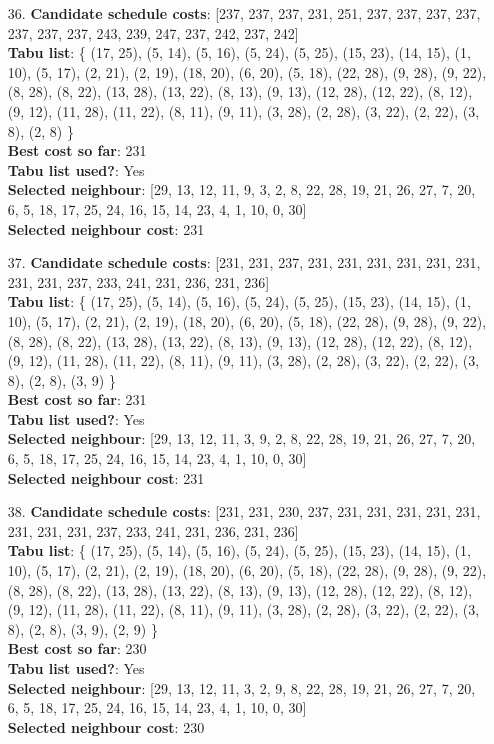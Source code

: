 \documentclass[fleqn]{article}
\begin{document}
\begin{itemize}
    \item[36.] \textbf{Candidate schedule costs}: [237, 237, 237, 231, 251, 237, 237, 237, 237, 237, 237, 237, 243, 239, 247, 237, 242, 237, 242] \\
    \textbf{Tabu list}: \{ (17, 25), (5, 14), (5, 16), (5, 24), (5, 25), (15, 23), (14, 15), (1, 10), (5, 17), (2, 21), (2, 19), (18, 20), (6, 20), (5, 18), (22, 28), (9, 28), (9, 22), (8, 28), (8, 22), (13, 28), (13, 22), (8, 13), (9, 13), (12, 28), (12, 22), (8, 12), (9, 12), (11, 28), (11, 22), (8, 11), (9, 11), (3, 28), (2, 28), (3, 22), (2, 22), (3, 8), (2, 8) \} \\
    \textbf{Best cost so far}: 231 \\
    \textbf{Tabu list used?}: Yes \\
    \textbf{Selected neighbour}: [29, 13, 12, 11, 9, 3, 2, 8, 22, 28, 19, 21, 26, 27, 7, 20, 6, 5, 18, 17, 25, 24, 16, 15, 14, 23, 4, 1, 10, 0, 30] \\
    \textbf{Selected neighbour cost}: 231
      

    \item[37.] \textbf{Candidate schedule costs}: [231, 231, 237, 231, 231, 231, 231, 231, 231, 231, 231, 237, 233, 241, 231, 236, 231, 236] \\
    \textbf{Tabu list}: \{ (17, 25), (5, 14), (5, 16), (5, 24), (5, 25), (15, 23), (14, 15), (1, 10), (5, 17), (2, 21), (2, 19), (18, 20), (6, 20), (5, 18), (22, 28), (9, 28), (9, 22), (8, 28), (8, 22), (13, 28), (13, 22), (8, 13), (9, 13), (12, 28), (12, 22), (8, 12), (9, 12), (11, 28), (11, 22), (8, 11), (9, 11), (3, 28), (2, 28), (3, 22), (2, 22), (3, 8), (2, 8), (3, 9) \} \\
    \textbf{Best cost so far}: 231 \\
    \textbf{Tabu list used?}: Yes \\
    \textbf{Selected neighbour}: [29, 13, 12, 11, 3, 9, 2, 8, 22, 28, 19, 21, 26, 27, 7, 20, 6, 5, 18, 17, 25, 24, 16, 15, 14, 23, 4, 1, 10, 0, 30] \\
    \textbf{Selected neighbour cost}: 231
      

    \item[38.] \textbf{Candidate schedule costs}: [231, 231, 230, 237, 231, 231, 231, 231, 231, 231, 231, 231, 237, 233, 241, 231, 236, 231, 236] \\
    \textbf{Tabu list}: \{ (17, 25), (5, 14), (5, 16), (5, 24), (5, 25), (15, 23), (14, 15), (1, 10), (5, 17), (2, 21), (2, 19), (18, 20), (6, 20), (5, 18), (22, 28), (9, 28), (9, 22), (8, 28), (8, 22), (13, 28), (13, 22), (8, 13), (9, 13), (12, 28), (12, 22), (8, 12), (9, 12), (11, 28), (11, 22), (8, 11), (9, 11), (3, 28), (2, 28), (3, 22), (2, 22), (3, 8), (2, 8), (3, 9), (2, 9) \} \\
    \textbf{Best cost so far}: 230 \\
    \textbf{Tabu list used?}: Yes \\
    \textbf{Selected neighbour}: [29, 13, 12, 11, 3, 2, 9, 8, 22, 28, 19, 21, 26, 27, 7, 20, 6, 5, 18, 17, 25, 24, 16, 15, 14, 23, 4, 1, 10, 0, 30] \\
    \textbf{Selected neighbour cost}: 230
      


\end{itemize}
\end{document}

